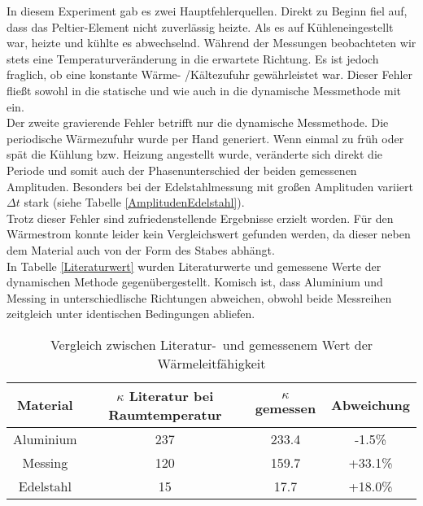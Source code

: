 In diesem Experiment gab es zwei Hauptfehlerquellen. Direkt zu Beginn fiel auf, dass das Peltier-Element nicht zuverlässig heizte. Als es auf \glqq Kühlen\grqq ein\-ge\-stel\-lt war, heizte und kühlte es abwechselnd. Während der Messungen beobachteten wir stets eine Temperaturveränderung in die erwartete Richtung. Es ist jedoch fraglich, ob eine konstante Wärme- /Kältezufuhr gewährleistet war. Dieser Fehler fließt sowohl in die statische und wie auch in die dynamische Messmethode mit ein. \\
Der zweite gravierende Fehler betrifft nur die dynamische Messmethode. Die periodische Wärmezufuhr wurde per Hand generiert. Wenn einmal zu früh oder spät die Kühlung bzw. Heizung angestellt wurde, veränderte sich direkt die Periode und somit auch der Phasenunterschied der beiden gemessenen Amplituden. Besonders bei der Edelstahlmessung mit großen Amplituden variiert $\Delta t$ stark (siehe Tabelle \ref{AmplitudenEdelstahl}). \\
Trotz dieser Fehler sind zufriedenstellende Ergebnisse erzielt worden. 
Für den Wärmestrom konnte leider kein Vergleichswert gefunden werden, da dieser neben dem Material auch von der Form des Stabes abhängt. \\ 
In Tabelle \ref{Literaturwert} wurden Literaturwerte und gemessene Werte der dynamischen Methode gegenübergestellt. Komisch ist, dass Aluminium und Messing in unterschiedlische Richtungen abweichen, obwohl beide Messreihen zeitgleich unter identischen Bedingungen abliefen.


\begin{table}[h!]
\begin{center}
\begin{tabular}{c|c|c|c}
	Material & $\kappa$ Literatur bei Raumtemperatur & $\kappa$ gemessen & Abweichung \\
\hline
	Aluminium & 237 & 233.4 & -1.5\% \\
	Messing & 120 & 159.7 & +33.1\% \\
	Edelstahl & 15 & 17.7 & +18.0\%\\
\end{tabular}
\end{center}
\caption[Vergleich zwischen Literatur- und gemessenem Wert der Wärmeleitfähigkeit]{Vergleich zwischen Literatur-\footnotemark\ und gemessenem Wert der Wärmeleitfähigkeit}
\end{table}
